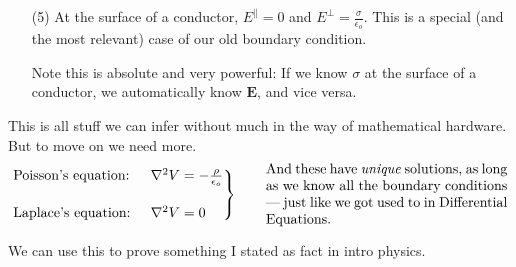 \documentclass{article}
\begin{document}
\begin{enumerate}
\begin{enumerate}

\item[(4a)] Net charges therefore reside on the surface of conductors.

\begin{mdframed}[backgroundcolor=black!4, align=center, userdefinedwidth=0.8\textwidth, topline=false, bottomline = false, leftline = false, rightline = false, frametitle = {Interlude}]

\begin{center}
\iclicker[scale=0.28]Clicker question
\end{center}

\end{mdframed}

\end{enumerate}

\item[(5)] At the surface of a conductor, $E^{\parallel} = 0$ and $E^{\perp} = \frac{\sigma}{\epsilon_o}$. This is a special (and the most relevant) case of our old boundary condition.

Note this is absolute and very powerful: If we know $\sigma$ at the surface of a conductor, we automatically know $\bm{E}$, and vice versa.

\end{enumerate}

This is all stuff we can infer without much in the way of mathematical hardware. But to move on we need more.
\begin{equation*}
    \begin{rcases} \text{Poisson's equation: }& \nabla^2 V = -\frac{\rho}{\epsilon_o} \\[1em] \text{Laplace's equation: }& \nabla^2 V = 0 \end{rcases} \qquad \parbox[c]{0.5\textwidth}{And these have \emph{unique} solutions, as long as we know all the boundary conditions --- just like we got used to in Differential Equations.}
\end{equation*}

We can use this to prove something I stated as fact in intro physics.
\end{document}
